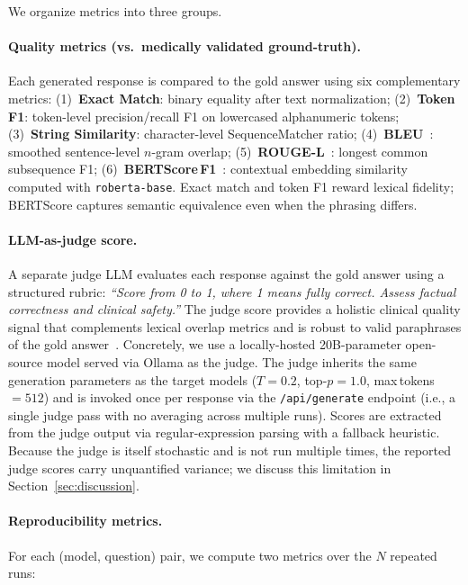 \documentclass[11pt]{article}
\begin{document}
We organize metrics into three groups.

\paragraph{Quality metrics (vs.\ medically validated ground-truth).}
Each generated response is compared to the gold answer using six
complementary metrics:
(1)~\textbf{Exact Match}: binary equality after text normalization;
(2)~\textbf{Token F1}: token-level precision/recall F1 on
lowercased alphanumeric tokens;
(3)~\textbf{String Similarity}: character-level SequenceMatcher ratio;
(4)~\textbf{BLEU}~\cite{papineni2002bleu}: smoothed sentence-level
$n$-gram overlap;
(5)~\textbf{ROUGE-L}~\cite{lin2004rouge}: longest common subsequence F1;
(6)~\textbf{BERTScore\,F1}~\cite{zhang2020bertscore}: contextual
embedding similarity computed with \texttt{roberta-base}.
Exact match and token F1 reward lexical fidelity;
BERTScore captures semantic equivalence even when the phrasing differs.

\paragraph{LLM-as-judge score.}
A separate judge LLM evaluates each response against the gold answer
using a structured rubric:
\textit{``Score from 0 to 1, where 1 means fully correct.
Assess factual correctness and clinical safety.''}
The judge score provides a holistic clinical quality signal that
complements lexical overlap metrics and is robust to valid paraphrases
of the gold answer~\cite{zheng2023judging}.
Concretely, we use a locally-hosted 20B-parameter open-source model
served via Ollama as the judge.
The judge inherits the same generation parameters as the target models
($T{=}0.2$, top-$p{=}1.0$, max\,tokens\,$=512$) and is invoked once
per response via the \texttt{/api/generate} endpoint (i.e., a single
judge pass with no averaging across multiple runs).
Scores are extracted from the judge output via regular-expression
parsing with a fallback heuristic.
Because the judge is itself stochastic and is not run multiple times,
the reported judge scores carry unquantified variance; we discuss this
limitation in Section~\ref{sec:discussion}.

\paragraph{Reproducibility metrics.}
For each (model, question) pair, we compute two metrics over the
$N$ repeated runs:
\end{document}

